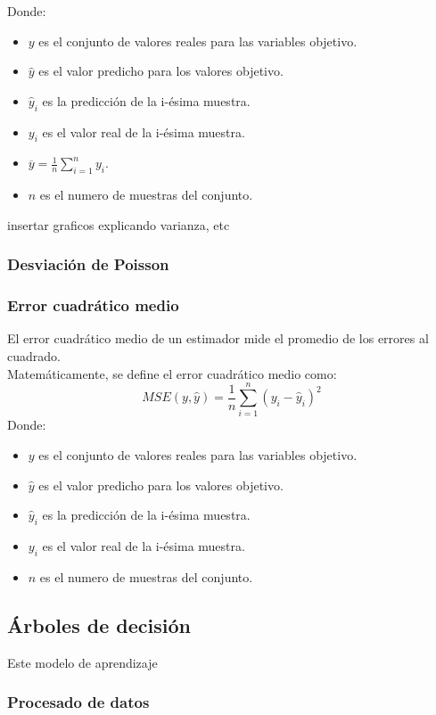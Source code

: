 Donde:
\begin{itemize}
	\item $y$ es el conjunto de valores reales para las variables objetivo.
	\item $\hat{y}$ es el valor predicho para los valores objetivo.
	\item $\hat{y}_i$ es la predicción de la  i-ésima muestra.
	\item $y_i$ es el valor real de la i-ésima muestra.
	\item $\overline{y} = \frac{1}{n} \sum_{i=1}^{n} y_i$.
	\item $n$ es el numero de muestras del conjunto.
\end{itemize}
insertar graficos explicando varianza,  etc
\subsubsection{Desviación de Poisson}
\subsubsection{Error cuadrático medio}
El error cuadrático medio de un estimador mide el promedio de los errores al cuadrado.  \\
Matemáticamente, se define el error cuadrático medio como:
\[
	MSE(y,\hat{y}) = \frac{1}{n} \sum_{i=1}^{n} (y_i - \hat{y}_i) ^2
\]
Donde:
\begin{itemize}
	\item $y$ es el conjunto de valores reales para las variables objetivo.
	\item $\hat{y}$ es el valor predicho para los valores objetivo.
	\item $\hat{y}_i$ es la predicción de la  i-ésima muestra.
	\item $y_i$ es el valor real de la i-ésima muestra.
	\item $n$ es el numero de muestras del conjunto.
\end{itemize}
\subsection{Árboles de decisión}
Este modelo de aprendizaje
\subsubsection{Procesado de datos}
